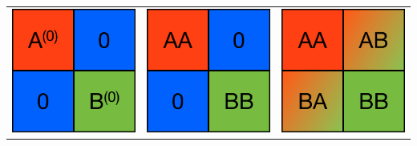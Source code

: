 \documentclass[%
    xcolor=usenames,dvipsnames,svgnames%
]{beamer}
\begin{document}
\begin{frame}
\begin{table}
\begin{tabular}{ccc}
      \includegraphics[scale=0.30]{./figures/block_1.pdf} & \includegraphics[scale=0.30]{./figures/block_2.pdf} & \includegraphics[scale=0.30]{./figures/block_3.pdf} \\

\end{tabular}
\end{table}
\end{frame}
\end{document}
